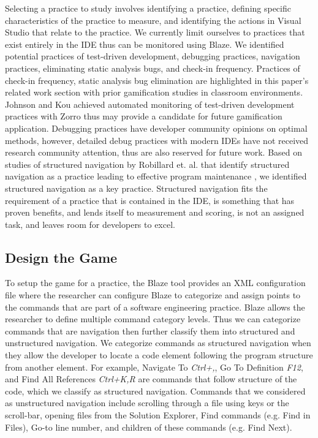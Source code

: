 \documentclass{sig-alternate}
\begin{document}
Selecting a practice to study involves identifying a practice, defining specific characteristics of the practice to measure, and identifying the actions in Visual Studio that relate to the practice.  We currently limit ourselves to practices that exist entirely in the IDE thus can be monitored using Blaze.  We identified potential practices of test-driven development, debugging practices, navigation practices,  eliminating static analysis bugs, and check-in frequency.  Practices of check-in frequency, static analysis bug elimination are highlighted in this paper's related work section with prior gamification studies in classroom environments.  Johnson and Kou achieved automated monitoring of test-driven development practices with Zorro thus may provide a candidate for future gamification application.   Debugging practices have developer community opinions on optimal methods, however, detailed debug practices with modern IDEs have not received research community attention, thus are also reserved for future work.  Based on studies of structured navigation by Robillard et. al. that identify structured navigation as a practice leading to effective program maintenance  \cite{wbsnipes:Robillard2004How}, we identified structured navigation as a key practice.   Structured navigation fits the requirement of a practice that is contained in the IDE, is something that has proven benefits, and lends itself to measurement and scoring, is not an assigned task, and leaves room for developers to excel.  

\subsection{Design the Game}

To setup the game for a practice, the Blaze tool provides an XML configuration file where the researcher can configure Blaze to categorize and assign points to the commands that are part of a software engineering practice.  Blaze allows the researcher to define multiple command category levels.  Thus we can categorize commands that are navigation then further classify them into structured and unstructured navigation.  We categorize commands as structured navigation when they allow the developer to locate a code element following the program structure from another element.  For example, Navigate To \textit{Ctrl+,}, Go To Definition \textit{F12}, and Find All References \textit{Ctrl+K,R} are commands that follow structure of the code, which we classify as structured navigation.
Commands that we considered as unstructured navigation include scrolling through a file using keys or the scroll-bar, opening files from the Solution Explorer, Find commands (e.g. Find in Files), Go-to line number, and children of these commands (e.g. Find Next).
\end{document}

